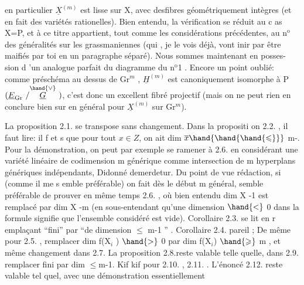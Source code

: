 
en particulier $\underline{X}^{(m)}$ est lisse sur X, avec des\hand{/}fibres géométriquement
intègres (et en fait des variétés rationelles). Bien entendu, la
vérification se réduit au c as X=P, et à ce titre appartient, tout
\margin{|}comme les considérations précédentes, au n$^{\text{o}}$ des généralités sur les
grassmaniennes (qui , je le vois déjà, vont inir par être maifiés
par toi en un paragraphe séparé). Nous sommes maintenant en posses-%
sion d 'un analogue parfait du diagramme du n$^{\text{o}}$1 . Encore un point
oublié: comme préschéma au dessus de Gr$^{m}$ , $\underline{H}^{(m)}$ est canoniquement
isomorphe à P$(\underline{E}_{\mathrm{Gr}}\ /\overset{\hand{\vee}}{\underline{G}}\ )$, c'est donc un excellent fibré projectif
(mais on ne peut rien en conclure bien sur en général pour $\underline{X}^{(m)}$ sur
Gr$^{m}$).

La proposition 2.1. se transpose sans changement. Dans la
propositi on 2.2. , il faut lire: il f et s que pour tout $x \in Z$, on
ait  dim $\overline{x} \hand{\hand{\hand{\leqslant}}}$ m-. Pour la démonstration, on peut par exemple
se ramener à 2.6. en considérant une  variété linéaire de
codimension m générique comme intersection de m hyperplans génériques
indépendants, Didonné demerdetur. Du point de vue rédaction, si
(comme il me s emble préférable) on fait dès le début m général, 
semble préférable de prouver en même temps 2.6. , où bien entendu
dim X -1 est remplacé par dim X -m (en sous-entendant qu'une dimension
$\hand{<}$ 0 dans la formule signifie que l'ensemble considéré est vide).
Corollaire 2.3. se lit en r emplaçant ``fini'' par ``de dimension $\leqslant$ 
m-1 '' . Corollaire 2.4. pareil ; De même pour 2.5. , remplacer
dim f(X$_{i}$ ) $\hand{>}$ 0 par dim f(X$_{i}$) $\hand{\geqslant}$ m , et même changement dans 2.7.
La proposition 2.8.reste valable telle quelle, dans 2.9. remplacer
fini par dim $\leqslant$m-1. Kif kif pour 2.10. , 2.11. . L'énoncé
2.12. reste valable tel quel, avec une démonstration essentiellement

